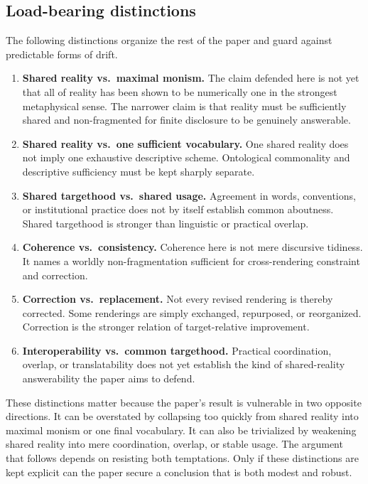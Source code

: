 \documentclass[11pt]{article}
\begin{document}
\subsection{Load-bearing distinctions}

The following distinctions organize the rest of the paper and guard against predictable forms of drift.

\begin{enumerate}
    \item \textbf{Shared reality vs.\ maximal monism.} The claim defended here is not yet that all of reality has been shown to be numerically one in the strongest metaphysical sense. The narrower claim is that reality must be sufficiently shared and non-fragmented for finite disclosure to be genuinely answerable.
    
    \item \textbf{Shared reality vs.\ one sufficient vocabulary.} One shared reality does not imply one exhaustive descriptive scheme. Ontological commonality and descriptive sufficiency must be kept sharply separate.
    
    \item \textbf{Shared targethood vs.\ shared usage.} Agreement in words, conventions, or institutional practice does not by itself establish common aboutness. Shared targethood is stronger than linguistic or practical overlap.
    
    \item \textbf{Coherence vs.\ consistency.} Coherence here is not mere discursive tidiness. It names a worldly non-fragmentation sufficient for cross-rendering constraint and correction.
    
    \item \textbf{Correction vs.\ replacement.} Not every revised rendering is thereby corrected. Some renderings are simply exchanged, repurposed, or reorganized. Correction is the stronger relation of target-relative improvement.
    
    \item \textbf{Interoperability vs.\ common targethood.} Practical coordination, overlap, or translatability does not yet establish the kind of shared-reality answerability the paper aims to defend.
\end{enumerate}

These distinctions matter because the paper's result is vulnerable in two opposite directions. It can be overstated by collapsing too quickly from shared reality into maximal monism or one final vocabulary. It can also be trivialized by weakening shared reality into mere coordination, overlap, or stable usage. The argument that follows depends on resisting both temptations. Only if these distinctions are kept explicit can the paper secure a conclusion that is both modest and robust.
\end{document}
